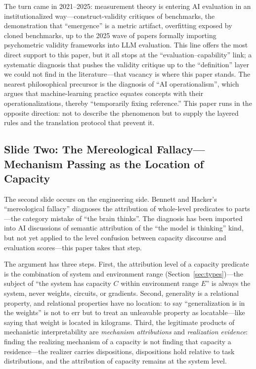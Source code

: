 \documentclass[10pt]{article}
\begin{document}
The turn came in 2021--2025: measurement theory is entering AI evaluation in an institutionalized way---construct-validity critiques of benchmarks\cite{raji2021benchmark}, the demonstration that ``emergence'' is a metric artifact\cite{schaeffer2023mirage}, overfitting exposed by cloned benchmarks\cite{zhang2024gsm1k}, up to the 2025 wave of papers formally importing psychometric validity frameworks into LLM evaluation\cite{bean2025measuring,salaudeen2025measurement,wallach2024evaluating,jo2025benchmark,xiao2023metriceval}. This line offers the most direct support to this paper, but it all stops at the ``evaluation--capability'' link; a systematic diagnosis that pushes the validity critique up to the ``definition'' layer we could not find in the literature---that vacancy is where this paper stands. The nearest philosophical precursor is the diagnosis of ``AI operationalism''\cite{mussgnug2024operationalism}, which argues that machine-learning practice equates concepts with their operationalizations, thereby ``temporarily fixing reference.'' This paper runs in the opposite direction: not to describe the phenomenon but to supply the layered rules and the translation protocol that prevent it.

\subsection{Slide Two: The Mereological Fallacy---Mechanism Passing as the Location of Capacity}

The second slide occurs on the engineering side. Bennett and Hacker's ``mereological fallacy'' diagnoses the attribution of whole-level predicates to parts---the category mistake of ``the brain thinks''\cite{bennett2003philosophical}. The diagnosis has been imported into AI discussions of semantic attribution of the ``the model is thinking'' kind\cite{vantill2024personification,helliwell2024wittgenstein}, but not yet applied to the level confusion between capacity discourse and evaluation scores---this paper takes that step.

The argument has three steps. First, the attribution level of a capacity predicate is the combination of system and environment range (Section~\ref{sec:types})---the subject of ``the system has capacity $C$ within environment range $E$'' is always the system, never weights, circuits, or gradients. Second, generality is a relational property\cite{yu2026theory}, and relational properties have no location: to say ``generalization is in the weights'' is not to err but to treat an unleavable property as locatable---like saying that weight is located in kilograms. Third, the legitimate products of mechanistic interpretability are \emph{mechanism attributions} and \emph{realization evidence}: finding the realizing mechanism of a capacity is not finding that capacity a residence---the realizer carries dispositions, dispositions hold relative to task distributions, and the attribution of capacity remains at the system level.
\end{document}
